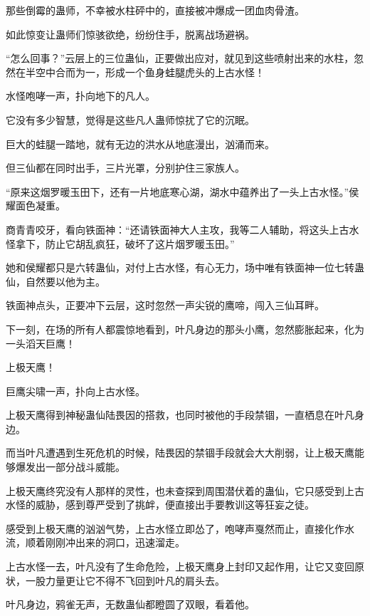 
\begin{this_body}



那些倒霉的蛊师，不幸被水柱砰中的，直接被冲爆成一团血肉骨渣。

如此惊变让蛊师们惊骇欲绝，纷纷住手，脱离战场避祸。

“怎么回事？”云层上的三位蛊仙，正要做出应对，就见到这些喷射出来的水柱，忽然在半空中合而为一，形成一个鱼身蛙腿虎头的上古水怪！

水怪咆哮一声，扑向地下的凡人。

它没有多少智慧，觉得是这些凡人蛊师惊扰了它的沉眠。

巨大的蛙腿一踏地，就有无边的洪水从地底漫出，汹涌而来。

但三仙都在同时出手，三片光罩，分别护住三家族人。

“原来这烟罗暖玉田下，还有一片地底寒心湖，湖水中蕴养出了一头上古水怪。”侯耀面色凝重。

商青青咬牙，看向铁面神：“还请铁面神大人主攻，我等二人辅助，将这头上古水怪拿下，防止它胡乱疯狂，破坏了这片烟罗暖玉田。”

她和侯耀都只是六转蛊仙，对付上古水怪，有心无力，场中唯有铁面神一位七转蛊仙，自然要以他为主。

铁面神点头，正要冲下云层，这时忽然一声尖锐的鹰啼，闯入三仙耳畔。

下一刻，在场的所有人都震惊地看到，叶凡身边的那头小鹰，忽然膨胀起来，化为一头滔天巨鹰！

上极天鹰！

巨鹰尖啸一声，扑向上古水怪。

上极天鹰得到神秘蛊仙陆畏因的搭救，也同时被他的手段禁锢，一直栖息在叶凡身边。

而当叶凡遭遇到生死危机的时候，陆畏因的禁锢手段就会大大削弱，让上极天鹰能够爆发出一部分战斗威能。

上极天鹰终究没有人那样的灵性，也未查探到周围潜伏着的蛊仙，它只感受到上古水怪的威胁，感到尊严受到了挑衅，便直接出手要教训这等狂妄之徒。

感受到上极天鹰的汹汹气势，上古水怪立即怂了，咆哮声戛然而止，直接化作水流，顺着刚刚冲出来的洞口，迅速溜走。

上古水怪一去，叶凡没有了生命危险，上极天鹰身上封印又起作用，让它又变回原状，一股力量更让它不得不飞回到叶凡的肩头去。

叶凡身边，鸦雀无声，无数蛊仙都瞪圆了双眼，看着他。


\end{this_body}
